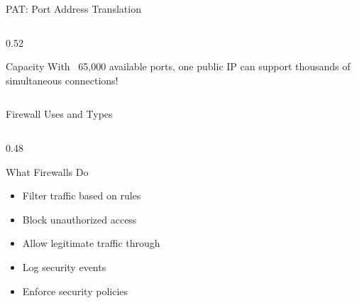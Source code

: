 \documentclass[aspectratio=169]{beamer}  %
\begin{document}
\begin{frame}{PAT: Port Address Translation}
\begin{columns}[T]
\begin{column}{0.52\textwidth}
            \vspace{0.2em}
            \begin{exampleblock}{Capacity}
                \small
                With ~65,000 available ports, one public IP can support thousands of simultaneous connections!
            \end{exampleblock}
        \end{column}
    \end{columns}
\end{frame}

\begin{frame}{Firewall Uses and Types}
    \begin{columns}[T]
        \begin{column}{0.48\textwidth}
            \begin{block}{What Firewalls Do}
                \small
                \begin{itemize}\setlength{\itemsep}{2pt}
                    \item Filter traffic based on rules
                    \item Block unauthorized access
                    \item Allow legitimate traffic through
                    \item Log security events
                    \item Enforce security policies
                \end{itemize}
            \end{block}
            

\end{column}
\end{columns}
\end{frame}
\end{document}
